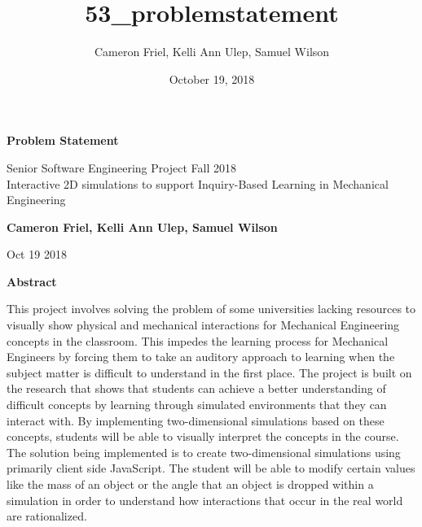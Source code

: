 \documentclass[10pt]{article}
\title{53_problemstatement}
\author{Cameron Friel, Kelli Ann Ulep, Samuel Wilson}
\date{October 19, 2018}
\begin{document}
\begin{titlepage}
   \begin{center}
       \vspace*{1cm}
 
       \textbf{Problem Statement}
 
       \vspace{0.5cm}
        Senior Software Engineering Project Fall 2018\\
        \vspace{0.5cm}
        Interactive 2D simulations to support Inquiry-Based Learning in Mechanical Engineering
        
        \vspace{0.5cm}
 
       \textbf{Cameron Friel, Kelli Ann Ulep, Samuel Wilson}
 
       \vspace{0.5cm}
 
        Oct 19 2018
       
       \vspace{1cm}
       
       \textbf{Abstract}
       
    \begin{flushleft}
This project involves solving the problem of some universities lacking resources to visually show physical and mechanical interactions for Mechanical Engineering concepts in the classroom. This impedes the learning process for Mechanical Engineers by forcing them to take an auditory approach to learning when the subject matter is difficult to understand in the first place. The project is built on the research that shows that students can achieve a better understanding of difficult concepts by learning through simulated environments that they can interact with. By implementing two-dimensional simulations based on these concepts, students will be able to visually interpret the concepts in the course. The solution being implemented is to create two-dimensional simulations using primarily client side JavaScript. The student will be able to modify certain values like the mass of an object or the angle that an object is dropped within a simulation in order to understand how interactions that occur in the real world are rationalized. 
    \end{flushleft}

   \end{center}

\end{titlepage}
\end{document}
